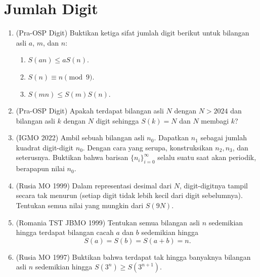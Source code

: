 \documentclass[12pt]{scrartcl}
\begin{document}
\section{Jumlah Digit}
\begin{enumerate}[resume]

	\item (Pra-OSP Digit)
	Buktikan ketiga sifat jumlah digit berikut untuk bilangan asli $a$, $m$, dan $n$:
	\begin{enumerate}
		\item $S(an) \le aS(n)$.
		\item $S(n) \equiv n \pmod{9}$.
		\item $S(mn) \le S(m)S(n)$.
	\end{enumerate}

	\item (Pra-OSP Digit)
	Apakah terdapat bilangan asli $N$ dengan $N > 2024$ dan bilangan asli $k$
	dengan $N$ digit sehingga $S(k) = N$ dan $N$ membagi $k$?

	\item (IGMO 2022)
	Ambil sebuah bilangan asli $n_0$. Dapatkan $n_1$ sebagai jumlah kuadrat digit-digit $n_0$.
	Dengan cara yang serupa, konstruksikan $n_2, n_3$, dan seterusnya.
	Buktikan bahwa barisan $\{n_i\}_{i = 0}^{\infty}$ selalu suatu saat akan periodik,
	berapapun nilai $n_0$.

	\item (Rusia MO 1999)
	Dalam representasi desimal dari $N$, digit-digitnya tampil secara tak menurun
	(setiap digit tidak lebih kecil dari digit sebelumnya).
	Tentukan semua nilai yang mungkin dari $S(9N)$.

	\item (Romania TST JBMO 1999)
	Tentukan semua bilangan asli $n$ sedemikian hingga terdapat bilangan cacah $a$ dan $b$
	sedemikian hingga
	\[ S(a) = S(b) = S(a + b) = n. \]

	\item (Rusia MO 1997)
	Buktikan bahwa terdapat tak hingga banyaknya bilangan asli $n$
	sedemikian hingga $S(3^n) \ge S(3^{n + 1})$.


\end{enumerate}
\end{document}
